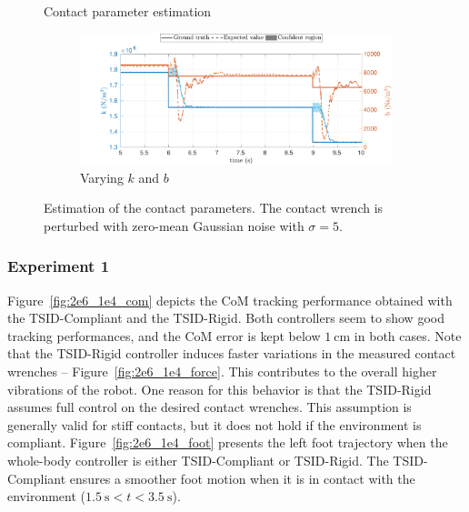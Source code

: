 \begin{figure}[!t]
\begin{myframe}{Contact parameter estimation}
\begin{subfigure}[b]{0.49\textwidth}
        \includegraphics[height=0.141\textheight]{chapter_compliant_contact/figures/compliant_spring_damper_varing_rls.pdf}
        \caption{Varying $k$ and $b$}
        \label{fig:compliant_spring_damper_varing_rls}
    \end{subfigure}
    \end{myframe}
    \caption{Estimation of the contact parameters. The contact wrench is perturbed with zero-mean Gaussian noise with $\sigma = 5$.}
\end{figure}




\subsubsection{Experiment 1} 
Figure~\ref{fig:2e6_1e4_com}  depicts the CoM tracking performance obtained with the TSID-Compliant and the TSID-Rigid. Both controllers seem to show good tracking performances, and the CoM error is kept below $\SI{1}{\centi \meter}$ in both cases. Note that the TSID-Rigid controller induces faster variations in the measured contact wrenches -- Figure~\ref{fig:2e6_1e4_force}. This contributes to the overall higher vibrations of the robot. One reason for this behavior is that the TSID-Rigid assumes full control on the desired contact wrenches. This assumption is generally valid for stiff contacts, but it does not hold if the environment is compliant. Figure~\ref{fig:2e6_1e4_foot} presents the left foot trajectory when the whole-body controller is either TSID-Compliant or TSID-Rigid. The TSID-Compliant ensures a smoother foot motion when it is in contact with the environment ($\SI{1.5}{\second}<t<\SI{3.5}{\second}$). 


